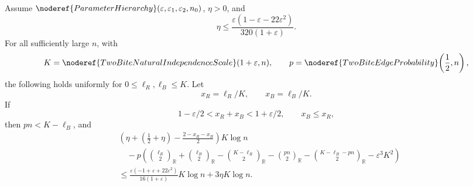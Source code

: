 \begin{lemma}
Assume \(\noderef{ParameterHierarchy}(\varepsilon,\varepsilon_1,\varepsilon_2,n_0)\),
\(\eta>0\), and
\[
\eta\le
\frac{\varepsilon(1-\varepsilon-22\varepsilon^2)}{320(1+\varepsilon)}.
\]
For all sufficiently large \(n\), with
\[
K=\noderef{TwoBiteNaturalIndependenceScale}(1+\varepsilon,n),
\qquad
p=\noderef{TwoBiteEdgeProbability}\!\left(\frac12,n\right),
\]
the following holds uniformly for \(0\le\ell_R,\ell_B\le K\).  Let
\[
x_R=\ell_R/K,\qquad x_B=\ell_B/K.
\]
If
\[
1-\varepsilon/2<x_R+x_B<1+\varepsilon/2,\qquad x_B\le x_R,
\]
then \(pn<K-\ell_B\), and
\[
\begin{aligned}
&\left(\eta+\left(\frac12+\eta\right)-\frac{2-x_R-x_B}{2}\right)K\log n\\
&\quad
-p\left(
\binom{\ell_R}{2}_{\mathbb R}+\binom{\ell_B}{2}_{\mathbb R}
-\binom{K-\ell_R}{2}_{\mathbb R}
-\binom{pn}{2}_{\mathbb R}
-\binom{K-\ell_B-pn}{2}_{\mathbb R}
-\varepsilon^3K^2\right)\\
&\le
\frac{\varepsilon(-1+\varepsilon+22\varepsilon^2)}{16(1+\varepsilon)}
K\log n+3\eta K\log n.
\end{aligned}
\]
\end{lemma}
